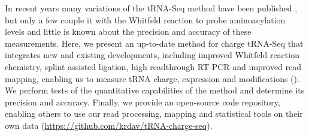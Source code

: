 \documentclass[9pt,lineno]{elife}
\begin{document}
In recent years many variations of the tRNA-Seq method have been published \citep{Wang2021-fc, Zheng2015-kj, Cozen2015-cx, Shigematsu2017-tv, Erber2020-qg, Thomas2021-fi, Lucas2023-vm, Pinkard2020-yd, Warren2021-wt, Yamagami2022-yb}, but only a few couple it with the Whitfeld reaction to probe aminoacylation levels \citep{Evans2017-st, Behrens2021-gb, Watkins2022-er} and little is known about the precision and accuracy of these measurements.
Here, we present an up-to-date method for charge tRNA-Seq that integrates new and existing developments, including improved Whitfeld reaction chemistry, splint assisted ligation, high readthrough RT-PCR and improved read mapping, enabling us to measure tRNA charge, expression and modifications ().
We perform tests of the quantitative capabilities of the method and determine its precision and accuracy.
Finally, we provide an open-source code repository, enabling others to use our read processing, mapping and statistical tools on their own data (\url{https://github.com/krdav/tRNA-charge-seq}).
\end{document}
